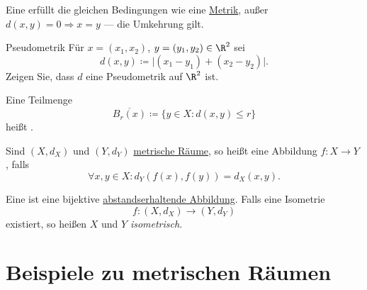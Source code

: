 \begin{definition}[Pseudometrik]
  \label{def:pseudometrik}
  Eine  erfüllt die gleichen Bedingungen wie eine \hyperref[def:metrik]{Metrik}, außer $ d(x,y) = 0 \Rightarrow x = y $ --- die Umkehrung gilt.
\end{definition}

\begin{assignment}{Pseudometrik}
  Für $ x = (x_1, x_2) $, $ y = (y_1, y_2) \in \R^2 $ sei
  \begin{equation*}
    d(x,y) \coloneqq \vert (x_1 - y_1) + (x_2-y_2) \vert\text{.}
  \end{equation*}
  Zeigen Sie, dass $ d $ eine Pseudometrik auf $ \R^2 $ ist.
\end{assignment}

\begin{definition}
  \label{def:abgeschlossenerBall}
  Eine Teilmenge
  \begin{equation*}
    \overline{B_r(x)} \coloneqq \{ y \in X : d(x,y) \leq r \}
  \end{equation*}
  heißt .
\end{definition}

\begin{definition}
  \label{def:abstandserhaltendeAbbildung}
  Sind $ (X, d_X) $ und $ (Y, d_Y) $ \hyperref[def:metrischerRaum]{metrische Räume}, so heißt eine Abbildung $ f: X \to Y $ , falls
  \begin{equation*}
    \forall x, y \in X: d_Y(f(x), f(y)) = d_X(x, y)\text{.}
  \end{equation*}
\end{definition}

\begin{definition}[Isometrie] 
  \label{def:isometrie}
  Eine  ist eine bijektive \hyperref[def:abstandserhaltendeAbbildung]{abstandserhaltende Abbildung}. Falls eine Isometrie
  \begin{equation*}
    f: (X, d_X) \to (Y, d_Y)
  \end{equation*}
  existiert, so heißen $ X $ und $ Y $ \emph{isometrisch}.
\end{definition}

\section{Beispiele zu metrischen Räumen}

